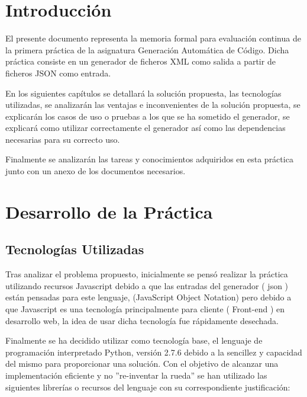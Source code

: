 \documentclass[a4paper,11pt]{book}
\begin{document}


\tableofcontents
\listoffigures

%

%


\chapter{Introducción}

El presente documento representa la memoria formal para evaluación continua de la primera práctica de la asignatura  Generación Automática de Código. Dicha práctica consiste en un generador de ficheros XML\cite{xml} como salida a partir de ficheros JSON\cite{json} como entrada. 

En los siguientes capítulos se detallará la solución propuesta, las tecnologías utilizadas, se analizarán las ventajas e inconvenientes de la solución propuesta, se explicarán los casos de uso o pruebas a los que se ha sometido el generador, se explicará como utilizar correctamente el generador así como las dependencias necesarias para su correcto uso. 

Finalmente se analizarán las tareas y conocimientos adquiridos en esta práctica junto con un anexo de los documentos necesarios.   



\chapter{Desarrollo de la Práctica}

\section{Tecnologías Utilizadas}
Tras analizar el problema propuesto, inicialmente se pensó realizar la práctica utilizando recursos Javascript debido a que las entradas del generador ( json ) están pensadas para este lenguaje, (JavaScript Object Notation) pero debido a que Javascript es una tecnología principalmente para cliente ( Front-end ) en desarrollo web, la idea de usar dicha tecnología fue rápidamente desechada.

Finalmente se ha decidido utilizar como tecnología base, el lenguaje de programación interpretado Python\cite{py}, versión 2.7.6 debido a la sencillez y capacidad del mismo para proporcionar una solución. Con el objetivo de alcanzar una implementación eficiente y no ''re-inventar la rueda'' se han utilizado las siguientes librerías o recursos del lenguaje con su correspondiente justificación: 
\end{document}
